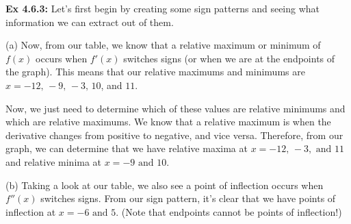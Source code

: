 \begin{tcolorbox}[solution]
    \textbf{Ex 4.6.3: } Let's first begin by creating some sign patterns and seeing what information we can extract out of them. \\
    \begin{center}
    \end{center} \vspace{11pt}
    \begin{center}
    \end{center} \vspace{11pt}
    (a) Now, from our table, we know that a relative maximum or minimum of $f(x)$ occurs when $f'(x)$ switches signs (or when we are at the endpoints of the graph). This means that our relative maximums and minimums are $x = -12, \, -9, \, -3, \, 10$, and $11$. \par 
    \vspace{11pt}
    Now, we just need to determine which of these values are relative minimums and which are relative maximums. We know that a relative maximum is when the derivative changes from positive to negative, and vice versa. Therefore, from our graph, we can determine that we have relative maxima at $\boxed{x = -12, \, -3, \text{ and } 11}$ and relative minima at $\boxed{x = -9 \text{ and } 10}$. \par
    \vspace{11pt}
    (b) Taking a look at our table, we also see a point of inflection occurs when $f''(x)$ switches signs. From our sign pattern, it's clear that we have points of inflection at $\boxed{x = -6 \text{ and } 5}$. (Note that endpoints cannot be points of inflection!)
\end{tcolorbox} \vspace{11pt}

